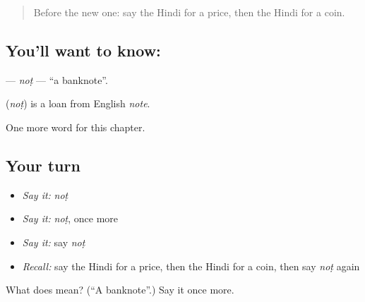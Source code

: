 \begin{quote}
Before the new one: say the Hindi for a price, then the Hindi for a coin.
\end{quote}

\subsection*{You'll want to know: }
\textbf{} — \emph{noṭ} — \textquotedblleft{}a banknote\textquotedblright{}.

\begin{cousinweb}
\textbf{} (\emph{noṭ}) is a loan from English \emph{note}.
\end{cousinweb}

\begin{grammarlens}[title={What you've built}]
One more word for this chapter.
\end{grammarlens}

\subsection*{Your turn}
\begin{itemize}
\raggedright
  \item \emph{Say it:} \emph{noṭ}
  \item \emph{Say it:} \emph{noṭ}, once more
  \item \emph{Say it:} say \emph{noṭ}
  \item \emph{Recall:} say the Hindi for a price, then the Hindi for a coin, then say \emph{noṭ} again
\end{itemize}

\begin{tcolorbox}[breakable,colback=teal!4,colframe=teal!35!black,title={Before you move on}]
What does  mean? (\textquotedblleft{}A banknote\textquotedblright{}.) Say it once more.
\end{tcolorbox}
